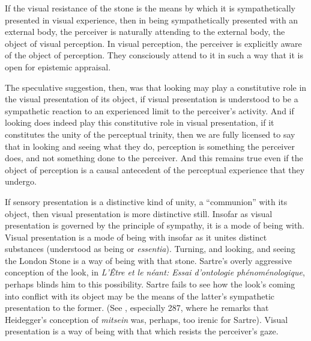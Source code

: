 \documentclass[12pt]{article}
\begin{document}
If the visual resistance of the stone is the means by which it is sympathetically presented in visual experience, then in being sympathetically presented with an external body, the perceiver is naturally attending to the external body, the object of visual perception. In visual perception, the perceiver is explicitly aware of the object of perception. They consciously attend to it in such a way that it is open for epistemic appraisal.

The speculative suggestion, then, was that looking may play a constitutive role in the visual presentation of its object, if visual presentation is understood to be a sympathetic reaction to an experienced limit to the perceiver's activity. And if looking does indeed play this constitutive role in visual presentation, if it constitutes the unity of the perceptual trinity, then we are fully licensed to say that in looking and seeing what they do, perception is something the perceiver does, and not something done to the perceiver. And this remains true even if the object of perception is a causal antecedent of the perceptual experience that they undergo.

If sensory presentation is a distinctive kind of unity, a ``communion'' with its object, then visual presentation is more distinctive still. Insofar as visual presentation is governed by the principle of sympathy, it is a mode of being with. Visual presentation is a mode of being with insofar as it unites distinct substances (understood as being or \emph{essentia}). Turning, and looking, and seeing the London Stone is a way of being with that stone. Sartre's overly aggressive conception of the look, in \emph{L'Être et le néant: Essai d'ontologie phénoménologique}, perhaps blinds him to this possibility. Sartre fails to see how the look's coming into conflict with its object may be the means of the latter's sympathetic presentation to the former. (See \citealt[chapter 5]{Jay:1994aa}, especially 287, where he remarks that Heidegger's conception of \emph{mitsein} was, perhaps, too irenic for Sartre). Visual presentation is a way of being with that which resists the perceiver's gaze.



\nocite{Broadie:1993dz}
\nocite{Hicks:1907uq}



\end{document}
